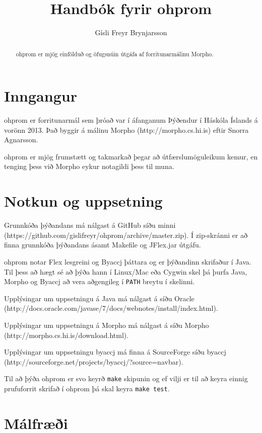 \documentclass[12pt,a4paper]{article}
\begin{document}
\sloppy
\title{Handbók fyrir ohprom}
\author{Gísli Freyr Brynjarsson}
\maketitle
\begin{center}
\end{center}
\pagebreak

\begin{abstract}
ohprom er mjög einfölduð og öfugsnúin útgáfa af forritunarmálinu Morpho.
\end{abstract}

\tableofcontents

\section{Inngangur}
ohprom er forritunarmál sem þróað var í áfanganum Þýðendur í Háskóla Íslands á vorönn 2013.
Það byggir á málinu Morpho (http://morpho.cs.hi.is) eftir Snorra Agnarsson.

ohprom er mjög frumstætt og takmarkað þegar að útfærslumöguleikum kemur, en tenging þess við Morpho
eykur notagildi þess til muna.
\section{Notkun og uppsetning}
Grunnkóða þýðandans má nálgast á GitHub síðu minni (https://github.com/gislifreyr/ohprom/archive/master.zip). Í zip-skránni er að finna grunnkóða þýðandans ásamt Makefile og JFlex.jar útgáfu.

ohprom notar Flex lesgreini og Byaccj þáttara og er þýðandinn skrifaður í Java. Til þess að hægt sé að þýða hann í Linux/Mac eða Cygwin skel þá þurfa Java, Morpho og Byaccj að vera aðgengileg í {\tt PATH} breytu í skelinni. 

Upplýsingar um uppsetningu á Java má nálgast á síðu Oracle (http://docs.oracle.com/javase/7/docs/webnotes/install/index.html).

Upplýsingar um uppsetningu á Morpho má nálgast á síðu Morpho (http://morpho.cs.hi.is/download.html).

Upplýsingar um uppsetningu byaccj má finna á SourceForge síðu byaccj (http://sourceforge.net/projects/byaccj/?source=navbar).


Til að þýða ohprom er svo keyrð {\tt make} skipunin og ef vilji er til að keyra einnig prufuforrit skrifað í ohprom þá skal keyra {\tt make test}.
\pagebreak

\section{Málfræði}
\end{document}
